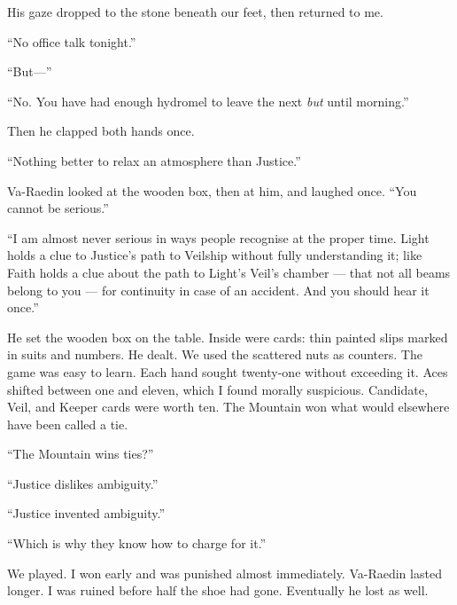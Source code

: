 His gaze dropped to the stone beneath our feet, then returned to me.\par

``No office talk tonight.''\par

``But---''\par

``No. You have had enough hydromel to leave the next \textit{but} until morning.''\par

Then he clapped both hands once.\par

``Nothing better to relax an atmosphere than Justice.''\par

Va-Raedin looked at the wooden box, then at him, and laughed once. ``You cannot be serious.''\par

``I am almost never serious in ways people recognise at the proper time. Light holds a clue to Justice's path to Veilship without fully understanding it; like Faith holds a clue about the path to Light's Veil's chamber --- that not all beams belong to you --- for continuity in case of an accident. And you should hear it once.''\par

He set the wooden box on the table. Inside were cards: thin painted slips marked in suits and numbers. He dealt. We used the scattered nuts as counters. The game was easy to learn. Each hand sought twenty-one without exceeding it. Aces shifted between one and eleven, which I found morally suspicious. Candidate, Veil, and Keeper cards were worth ten. The Mountain won what would elsewhere have been called a tie.\par

``The Mountain wins ties?''\par

``Justice dislikes ambiguity.''\par

``Justice invented ambiguity.''\par

``Which is why they know how to charge for it.''\par

We played. I won early and was punished almost immediately. Va-Raedin lasted longer. I was ruined before half the shoe had gone. Eventually he lost as well.\par

